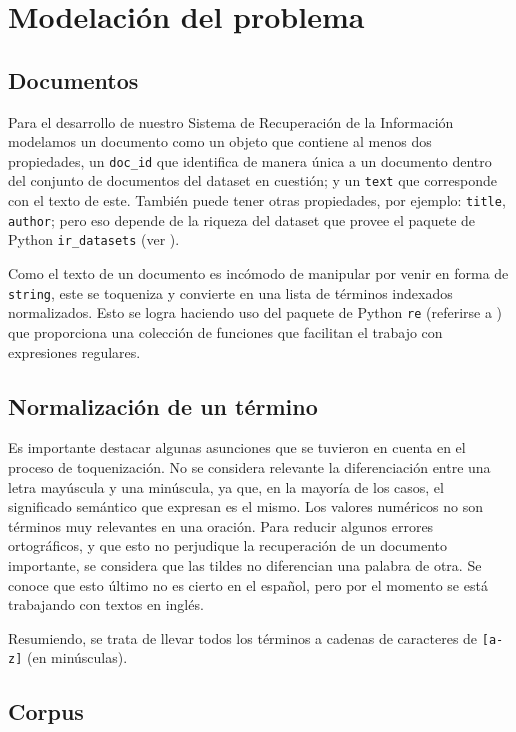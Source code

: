 \documentclass{llncs}
\begin{document}
\section{Modelaci\'on del problema}
    
    \subsection{Documentos}
        Para el desarrollo de nuestro Sistema de Recuperaci\'on de la Informaci\'on modelamos un documento como un objeto que contiene al menos dos propiedades, un \texttt{doc\_id} que identifica de manera \'unica a un documento dentro del conjunto de documentos del dataset en cuesti\'on; y un \texttt{text} que corresponde con el texto de este. Tambi\'en puede tener otras propiedades, por ejemplo: \texttt{title}, \texttt{author}; pero eso depende de la riqueza del dataset que provee el paquete de Python \texttt{ir\_datasets} (ver \cite{B3}).

        Como el texto de un documento es inc\'omodo de manipular por venir en forma de \texttt{string}, este se toqueniza y convierte en una lista de t\'erminos indexados normalizados. Esto se logra haciendo uso del paquete de Python \texttt{re} (referirse a \cite{B4}) que proporciona una colecci\'on de funciones que facilitan el trabajo con expresiones regulares. 

    \subsection{Normalizaci\'on de un t\'ermino}
        
        Es importante destacar algunas asunciones que se tuvieron en cuenta en el proceso de toquenizaci\'on. No se considera relevante la diferenciación entre una letra may\'uscula y una min\'uscula, ya que, en la mayoría de los casos, el significado sem\'antico que expresan es el mismo. Los valores num\'ericos no son términos muy relevantes en una oración. Para reducir algunos errores ortográficos, y que esto no perjudique la recuperaci\'on de un documento importante, se considera que las tildes no diferencian una palabra de otra. Se conoce que esto \'ultimo no es cierto en el español, pero por el momento se est\'a trabajando con textos en ingl\'es.

        Resumiendo, se trata de llevar todos los t\'erminos a cadenas de caracteres de \texttt{[a-z]} (en minúsculas).

    \subsection{Corpus}
\end{document}
